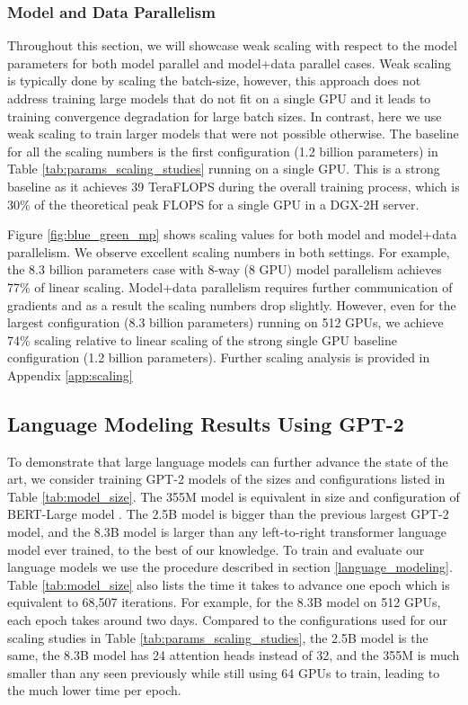 \subsubsection{Model and Data Parallelism} Throughout this section, we will showcase weak scaling with respect to the model parameters for both model parallel and model+data parallel cases. Weak scaling is typically done by scaling the batch-size, however, this approach does not address training large models that do not fit on a single GPU and it leads to training convergence degradation for large batch sizes. In contrast, here we use weak scaling to train larger models that were not possible otherwise. The baseline for all the scaling numbers is the first configuration (1.2 billion parameters) in Table \ref{tab:params_scaling_studies} running on a single GPU. This is a strong baseline as it achieves 39 TeraFLOPS during the overall training process, which is 30\% of the theoretical peak FLOPS for a single GPU in a DGX-2H server. 

Figure \ref{fig:blue_green_mp} shows scaling values for both model and model+data parallelism. We observe excellent scaling numbers in both settings. For example, the 8.3 billion parameters case with 8-way (8 GPU) model parallelism achieves 77\% of linear scaling. Model+data parallelism requires further communication of gradients and as a result the scaling numbers drop slightly. However, even for the largest configuration (8.3 billion parameters) running on 512 GPUs, we achieve 74\% scaling relative to linear scaling of the strong single GPU baseline configuration (1.2 billion parameters). Further scaling analysis is provided in Appendix \ref{app:scaling}

\subsection{Language Modeling Results Using GPT-2} To demonstrate that large language models can further advance the state of the art, we consider training GPT-2 models of the sizes and configurations listed in Table \ref{tab:model_size}. The 355M model is equivalent in size and configuration of BERT-Large model \cite{devlin2018bert}. The 2.5B model is bigger than the previous largest GPT-2 model, and the 8.3B model is larger than any left-to-right transformer language model ever trained, to the best of our knowledge. To train and evaluate our language models we use the procedure described in section \ref{language_modeling}. Table \ref{tab:model_size} also lists the time it takes to advance one epoch which is equivalent to 68,507 iterations. For example, for the 8.3B model on 512 GPUs, each epoch takes around two days. Compared to the configurations used for our scaling studies in Table \ref{tab:params_scaling_studies}, the 2.5B model is the same, the 8.3B model has 24 attention heads instead of 32, and the 355M is much smaller than any seen previously while still using 64 GPUs to train, leading to the much lower time per epoch.

